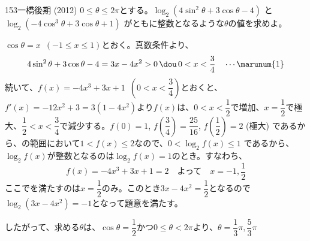 \begin{prob}{153}{\maru}{一橋後期 (2012)}
 $0\le\theta\le 2\pi$とする。$\log_2 (4\sin^2\theta+3\cos\theta-4)$ と $\log_2 (-4\cos^3\theta+3\cos\theta+1)$ がともに整数となるような$\theta$の値を求めよ。
\end{prob}

$\cos\theta=x$~$(-1\le x\le 1)$とおく。真数条件より、
\[ 4\sin^2\theta+3\cos\theta-4=3x-4x^2 > 0 \,\dou\, 0<x<\frac{3}{4} \quad \cdots \marunum{1} \]
続いて、$f(x)=-4x^3+3x+1$~$(0<x<\dfrac{3}{4})$とおくと、$f'(x)=-12x^2+3=3(1-4x^2)$より$f(x)$は、$0<x<\dfrac{1}{2}$で増加、$x=\dfrac{1}{2}$で極大、$\dfrac{1}{2}<x<\dfrac{3}{4}$で減少する。$f(0)=1$, $f\left(\dfrac{3}{4}\right)=\dfrac{25}{16}$, $f\left(\dfrac{1}{2}\right)=2$ (極大) であるから、の範囲において$1<f(x)\le 2$なので、$0<\log_2{f(x)}\le 1$ であるから、$\log_2{f(x)}$が整数となるのは$\log_2{f(x)}=1$のとき。すなわち、
\[ f(x)=-4x^3+3x+1=2 \quad  \text{よって}\quad x=-1, \frac{1}{2} \]
ここでを満たすのは$x=\dfrac{1}{2}$のみ。このとき$3x-4x^2=\dfrac{1}{2}$となるので$\log_2{(3x-4x^2)}=-1$となって題意を満たす。

したがって、求める$\theta$は、$\cos\theta=\dfrac{1}{2}$かつ$0\le \theta < 2\pi$より、$\theta=\dfrac{1}{3}\pi, \dfrac{5}{3}\pi$